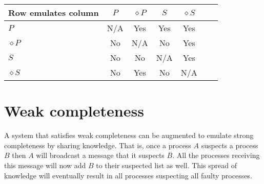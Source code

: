 \documentclass[11pt]{amsart}
\begin{document}
\begin{tabular}{|l|c|c|c|c|c|c|}
\hline
Row emulates column  & $P$ & $\diamond P$ & $S$ & $\diamond S$ \\ \hline
$P$                  & N/A & Yes          & Yes & Yes          \\ \hline
$\diamond P$         & No  & N/A          & No  & Yes          \\ \hline
$S$                  & No  & No           & N/A & Yes          \\ \hline
$\diamond S$         & No  & Yes          & No  & N/A          \\ \hline
\end{tabular}


\section{Weak completeness}

A system that satisfies weak completeness can be augmented to emulate strong
completeness by sharing knowledge. That is, once a process $A$ suspects a
process $B$ then $A$ will broadcast a message that it suspects $B$. All the
processes receiving this message will now add $B$ to their suspected list as
well. This spread of knowledge will eventually result in all processes
suspecting all faulty processes.
\end{document}
